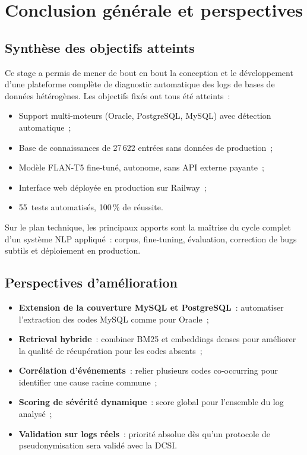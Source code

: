 \documentclass[12pt,a4paper]{report}
\begin{document}
\chapter*{Conclusion g\'en\'erale et perspectives}

\section*{Synth\`ese des objectifs atteints}

Ce stage a permis de mener de bout en bout la conception et le d\'eveloppement
d'une plateforme compl\`ete de diagnostic automatique des logs de bases de donn\'ees
h\'et\'erog\`enes. Les objectifs fix\'es ont tous \'et\'e atteints~:
\begin{itemize}[leftmargin=*]
  \item Support multi-moteurs (Oracle, PostgreSQL, MySQL) avec d\'etection automatique~;
  \item Base de connaissances de 27\,622 entr\'ees sans donn\'ees de production~;
  \item Mod\`ele FLAN-T5 fine-tun\'e, autonome, sans API externe payante~;
  \item Interface web d\'eploy\'ee en production sur Railway~;
  \item 55~tests automatis\'es, 100\,\% de r\'eussite.
\end{itemize}

Sur le plan technique, les principaux apports sont la ma\^itrise du cycle complet
d'un syst\`eme NLP appliqu\'e~: corpus, fine-tuning, \'evaluation, correction de
bugs subtils et d\'eploiement en production.

\section*{Perspectives d'am\'elioration}

\begin{itemize}[leftmargin=*]
  \item \textbf{Extension de la couverture MySQL et PostgreSQL}~: automatiser
        l'extraction des codes MySQL comme pour Oracle~;
  \item \textbf{Retrieval hybride}~: combiner BM25 et embeddings denses pour am\'eliorer
        la qualit\'e de r\'ecup\'eration pour les codes absents~;
  \item \textbf{Corr\'elation d'\'ev\'enements}~: relier plusieurs codes co-occurring
        pour identifier une cause racine commune~;
  \item \textbf{Scoring de s\'ev\'erit\'e dynamique}~: score global pour l'ensemble
        du log analys\'e~;
  \item \textbf{Validation sur logs r\'eels}~: priorit\'e absolue d\`es qu'un
        protocole de pseudonymisation sera valid\'e avec la DCSI.
\end{itemize}
\end{document}
